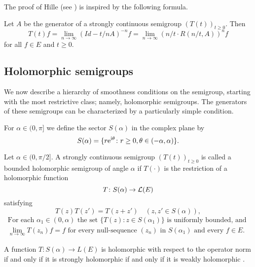 The proof of Hille (see \citet{kato:1966}) is inspired by the following formula.
\begin{proposition}\label{prop:a2-1.10}
Let $A$ be the generator of a strongly continuous semigroup $(T(t))_{t \geq 0}$.
Then
\begin{equation}\label{eq:a2-1.3}
    T(t)f = \lim_{n \to \infty} (Id - t/nA)^{-n} f = \lim_{n \to \infty} (n/t \cdot R(n/t,A))^{n} f
\end{equation}
for all $f \in E$ and $t \geq 0$.
\end{proposition}
\subsection{Holomorphic semigroups} \label{subsec:a2-1.se4}%

We now describe a hierarchy of smoothness conditions on the semigroup, starting with the most restrictive class; namely, holomorphic semigroups.
The generators of these semigroups can be characterized by a particularly simple condition.

For $\alpha \in (0,\pi]$ we define the sector $S(\alpha)$ in the complex plane by
\[
    S(\alpha) = \{r\mathrm{e}^{\mathrm{i}\theta} \colon r \geq 0, \theta \in (-\alpha,\alpha)\} .
\]

\begin{definition}\label{def:a2-1.11}
Let $\alpha \in (0,\pi/2]$.
A strongly continuous semigroup $(T(t))_{t \geq 0}$ is called a bounded holomorphic semigroup of angle $\alpha$ if $T(\cdot)$ is the restriction of a holomorphic function
\[
    T \colon S(\alpha) \to \mathcal{L}(E)
\]
satisfying
\begin{equation}\label{eq:a2-1.4}
    T(z)T(z') = T(z+z') \quad (z,z' \in S(\alpha)),
\end{equation}
\begin{equation}\label{eq:a2-1.5}
\begin{split}
    \text{For each } \alpha_{1} \in (0,\alpha) \text{ the set } \{T(z) \colon z \in S(\alpha_{1})\} \text{ is uniformly bounded, and }\\
     \lim_{n \to \infty} T(z_{n})f = f \text{ for every null-sequence } (z_{n}) \text{ in } S(\alpha_{1}) \text{ and every } f \in E.
\end{split}     
\end{equation}
\end{definition}

\begin{remark*}\label{rem:a2-1.5-kgk}
A function $T \colon S(\alpha) \to L(E)$ is holomorphic with respect to the operator norm if and only if it is strongly holomorphic if and only if it is weakly holomorphic \citet[V.3]{yosida:1965}.
\end{remark*}

